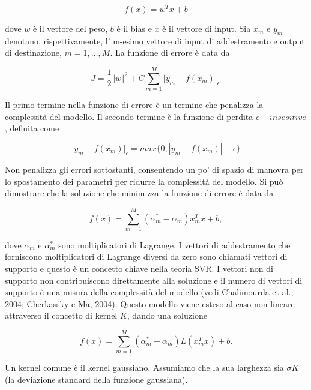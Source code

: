 \documentclass[12pt,a4paper]{report}
\begin{document}
\begin{equation}
    {\displaystyle f(x) = w^Tx + b}
\end{equation}

dove $w$ è il vettore del peso, $b$ è il bias e $x$ è il vettore di input. Sia $x_m$ e $y_m$ denotano, rispettivamente, l' m-esimo vettore di input di addestramento e output di destinazione, $m = 1, …, M$. La funzione di errore è data da 

\begin{equation}
    {\displaystyle J = \frac{1}{2}\Vert w \Vert^2 + C\sum\limits_{m=1}^M\vert y_m - f(x_m) \vert_{\epsilon^{\centerdot}} }
\end{equation}

Il primo termine nella funzione di errore è un termine che penalizza la complessità del modello. Il secondo termine è la funzione di perdita $\epsilon-insesitive$, definita come

\begin{equation}
    {\displaystyle \vert y_m - f(x_m) \vert_{\epsilon} = max\{0,|y_m - f(x_m)|-\epsilon\}}
\end{equation}

Non penalizza gli errori sottostanti, consentendo un po' di spazio di manovra per lo spostamento dei parametri per ridurre la complessità del modello. Si può dimostrare che la soluzione che minimizza la funzione di errore è data da

\begin{equation}
    {\displaystyle f(x) = \sum\limits_{m=1}^{M}(\alpha^*_m - \alpha_m)x_m^Tx + b},
\end{equation}

dove $\alpha_m$ e $\alpha_m^\ast$ sono moltiplicatori di Lagrange. I vettori di addestramento che forniscono moltiplicatori di Lagrange diversi da zero sono chiamati vettori di supporto e questo è un concetto chiave nella teoria SVR. I vettori non di supporto non contribuiscono direttamente alla soluzione e il numero di vettori di supporto è una misura della complessità del modello (vedi Chalimourda et al., 2004; Cherkassky e Ma, 2004). Questo modello viene esteso al caso non lineare attraverso il concetto di kernel $K$, dando una soluzione

\begin{equation}
    {\displaystyle f(x) = \sum\limits_{m=1}^{M}(\alpha^*_m - \alpha_m)L(x_m^Tx) + b}.
\end{equation}

Un kernel comune è il kernel gaussiano. Assumiamo che la sua larghezza sia $\sigma K$ (la deviazione standard della funzione gaussiana).
\end{document}
